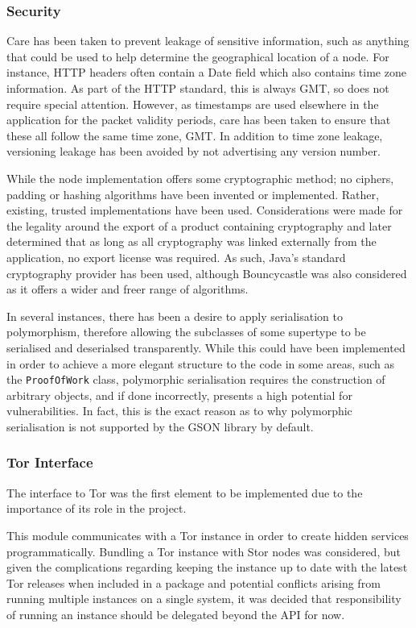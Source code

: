 		\subsubsection*{Security}
			Care has been taken to prevent leakage of sensitive information, such as anything that could be used to help determine the geographical location of a node. For instance, HTTP headers often contain a Date field which also contains time zone information. As part of the HTTP standard, this is always GMT, so does not require special attention. However, as timestamps are used elsewhere in the application for the packet validity periods, care has been taken to ensure that these all follow the same time zone, GMT. In addition to time zone leakage, versioning leakage has been avoided by not advertising any version number.
			
			While the node implementation offers some cryptographic method; no ciphers, padding or hashing algorithms have been invented or implemented. Rather, existing, trusted implementations have been used. Considerations were made for the legality around the export of a product containing cryptography and later determined that as long as all cryptography was linked externally from the application, no export license was required. As such, Java's standard cryptography provider has been used, although Bouncycastle was also considered as it offers a wider and freer range of algorithms.
			
			In several instances, there has been a desire to apply serialisation to polymorphism, therefore allowing the subclasses of some supertype to be serialised and deserialsed transparently. While this could have been implemented in order to achieve a more elegant structure to the code in some areas, such as the \texttt{ProofOfWork} class, polymorphic serialisation requires the construction of arbitrary objects, and if done incorrectly, presents a high potential for vulnerabilities. In fact, this is the exact reason as to why polymorphic serialisation is not supported by the GSON library by default.
			
		\subsubsection*{Tor Interface}
			The interface to Tor was the first element to be implemented due to the importance of its role in the project.
			
			This module communicates with a Tor instance in order to create hidden services programmatically. Bundling a Tor instance with Stor nodes was considered, but given the complications regarding keeping the instance up to date with the latest Tor releases when included in a package and potential conflicts arising from running multiple instances on a single system, it was decided that responsibility of running an instance should be delegated beyond the API for now.
			
